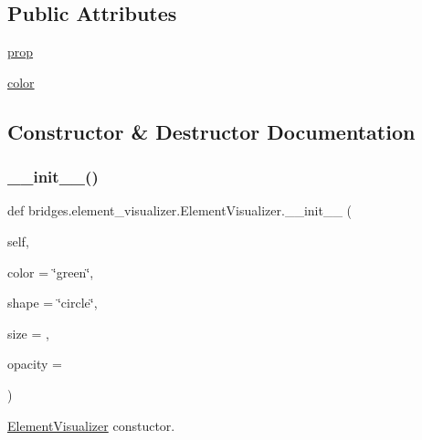 \subsection*{Public Attributes}
\begin{DoxyCompactItemize}
\item 
\hyperlink{classbridges_1_1element__visualizer_1_1_element_visualizer_ac60ae1b3b3668b03dc4017e0ba4a199b}{prop}
\item 
\hyperlink{classbridges_1_1element__visualizer_1_1_element_visualizer_a1fd985698e1c56289ed49fa7849d43ab}{color}
\end{DoxyCompactItemize}


\subsection{Constructor \& Destructor Documentation}
\mbox{\label{classbridges_1_1element__visualizer_1_1_element_visualizer_a27ee5eddf78bac93e2702b2f2203518a}} 
\subsubsection{\texorpdfstring{\+\_\+\+\_\+init\+\_\+\+\_\+()}{\_\_init\_\_()}}
{\footnotesize\ttfamily def bridges.\+element\+\_\+visualizer.\+Element\+Visualizer.\+\_\+\+\_\+init\+\_\+\+\_\+ (\begin{DoxyParamCaption}\item[{}]{self,  }\item[{}]{color = {\ttfamily \char`\"{}green\char`\"{}},  }\item[{}]{shape = {\ttfamily \char`\"{}circle\char`\"{}},  }\item[{}]{size = {},  }\item[{}]{opacity = {} }\end{DoxyParamCaption})}



\hyperlink{classbridges_1_1element__visualizer_1_1_element_visualizer}{Element\+Visualizer} constuctor. 

